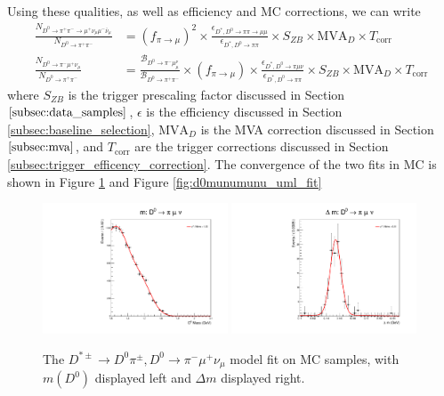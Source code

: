Using these qualities, as well as efficiency and MC corrections, we can write
\begin{equation}
\begin{split}
    \frac{N_{D^0 \to \pi^+ \pi^- \to \mu^+ \nu_\mu \mu^- \bar{\nu}_\mu}}{N_{D^0 \to \pi^+ \pi^-}} &= \left(f_{\pi \to \mu}\right)^2 \times \frac{\epsilon_{D^*, D^0\to\pi\pi\to\mu\mu}}{\epsilon_{D^*, D^0\to\pi\pi}} \times S_{ZB} \times \text{MVA}_D \times T_{\text{corr}} \\
    \frac{N_{D^0 \to \pi^- \mu^+ \nu_\mu}}{N_{D^0 \to \pi^+ \pi^-}} &=\frac{\mathcal{B}_{D^0 \to \pi^- \mu^ \nu_\mu}}{\mathcal{B}_{D^0 \to \pi^+ \pi^-}} \times \left(f_{\pi \to \mu}\right) \times \frac{\epsilon_{D^*, D^0\to\pi\mu\nu}}{\epsilon_{D^*, D^0\to\pi\pi}} \times S_{ZB} \times \text{MVA}_D \times T_{\text{corr}}
    \label{eq:peaking_background_yield_calculation}
\end{split}
\end{equation}
where $S_{ZB}$ is the trigger prescaling factor discussed in Section $\ref{subsec:data_samples}$, $\epsilon$ is the efficiency discussed in Section \ref{subsec:baseline_selection}, $\text{MVA}_D$ is the MVA correction discussed in Section $\ref{subsec:mva}$, and $T_{\text{corr}}$ are the trigger corrections discussed in Section \ref{subsec:trigger_efficency_correction}. The convergence of the two fits in MC is shown in Figure \ref{fig:d0pimunu_uml_fit} and Figure \ref{fig:d0munumunu_uml_fit}

\begin{figure}[htp]
    \begin{center}
      \includegraphics[width=0.49\textwidth]{figures/chapter4/signal_fit/d0pimunu_2022_2023_0_m.pdf}
      \includegraphics[width=0.49\textwidth]{figures/chapter4/signal_fit/d0pimunu_2022_2023_0_dm.pdf}\\
    \end{center}
    \caption{
      The $D^{*\pm} \to D^0\pi^\pm, D^0 \to \pi^- \mu^+ \nu_\mu$ model fit on MC samples, with $m(D^0)$ displayed left and $\Delta m$ displayed right.
    }
    \label{fig:d0pimunu_uml_fit}
\end{figure}

